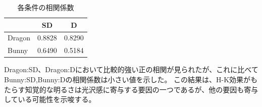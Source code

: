     \begin{table}
        \centering
        \caption{各条件の相関係数}
        \begin{tabular}{|l||c|c|} \hline
                        & SD       & D        \\ \hline \hline
            Dragon      & 0.8828   & 0.8290   \\ \hline
            Bunny       & 0.6490   & 0.5184   \\ \hline
        \end{tabular}
    \end{table}

    Dragon:SD、Dragon:Dにおいて比較的強い正の相関が見られたが、これに比べてBunny:SD,Bunny:Dの相関係数は小さい値を示した。
    この結果は、H-K効果がもたらす知覚的な明るさは光沢感に寄与する要因の一つであるが、他の要因も寄与している可能性を示唆する。